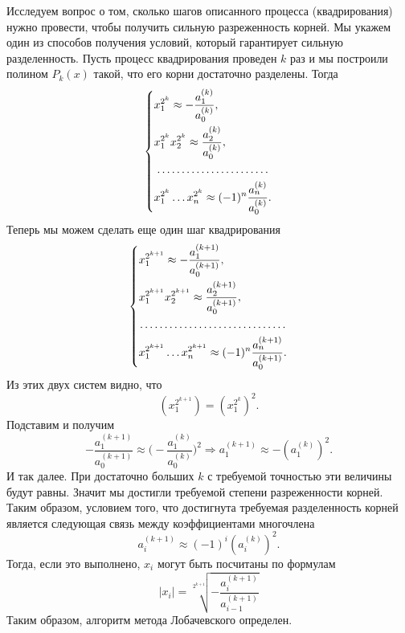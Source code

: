 \documentclass[a4paper, 12pt]{report}
\numberwithin{equation}{section}
\begin{document}
Исследуем вопрос о том, сколько шагов описанного процесса (квадрирования) нужно провести, чтобы получить сильную разреженность корней. Мы укажем один из способов получения условий, который гарантирует сильную разделенность. Пусть процесс квадрирования проведен $k$ раз и мы построили полином $P_k(x)$ такой, что его корни достаточно разделены. Тогда $$\begin{dcases}
x_1^{2^k}\approx -\dfrac{a_1^{(k)}}{a_0^{(k)}},\\
x_1^{2^k}x_2^{2^k}\approx \dfrac{a_2^{(k)}}{a_0^{(k)}},\\
\dotfill\\
x_1^{2^k}\ldots x_n^{2^k}\approx (-1)^n\dfrac{a_n^{(k)}}{a_0^{(k)}}.
\end{dcases}$$
Теперь мы можем сделать еще один шаг квадрирования 
$$\begin{dcases}
	x_1^{2^{k+1}}\approx -\dfrac{a_1^{(k+1)}}{a_0^{(k+1)}},\\
	x_1^{2^{k+1}}x_2^{2^{k+1}}\approx \dfrac{a_2^{(k+1)}}{a_0^{(k+1)}},\\
	\dotfill\\
	x_1^{2^{k+1}}\ldots x_n^{2^{k+1}}\approx (-1)^n\dfrac{a_n^{(k+1)}}{a_0^{(k+1)}}.
\end{dcases}$$
Из этих двух систем видно, что $$(x_1^{2^{k+1}}) = (x_1^{2^k})^2.$$
Подставим и получим $$-\dfrac{a_1^{(k+1)}}{a_0^{(k+1)}}\approx \Big(-\dfrac{a_1^{(k)}}{a_0^{(k)}}\Big)^2 \Rightarrow a_1^{(k+1)}\approx -(a_1^{(k)})^2.$$
И так далее. При достаточно больших $k$ с требуемой точностью эти величины будут равны. Значит мы достигли требуемой степени разреженности корней. Таким образом, условием того, что достигнута требуемая разделенность корней является следующая связь между коэффициентами многочлена
\begin{equation}
	a_i^{(k+1)}\approx (-1)^i(a_i^{(k)})^2.
\end{equation}
Тогда, если это выполнено, $x_i$ могут быть посчитаны по формулам \begin{equation}
	|x_i| = \sqrt[2^{k+1}]{-\dfrac{a_i^{(k+1)}}{a_{i-1}^{(k+1)}}}
\end{equation}
Таким образом, алгоритм метода Лобачевского определен.
\end{document}
